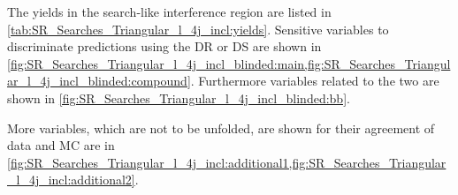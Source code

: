 The yields in the search-like interference region are listed in
\cref{tab:SR_Searches_Triangular_l_4j_incl:yields}.
Sensitive variables to discriminate predictions using the DR or DS are shown in
\cref{fig:SR_Searches_Triangular_l_4j_incl_blinded:main,fig:SR_Searches_Triangular_l_4j_incl_blinded:compound}.
Furthermore variables related to the two \bjets are shown in
\cref{fig:SR_Searches_Triangular_l_4j_incl_blinded:bb}.

More variables, which are not to be unfolded, are shown for their agreement of data and MC are
in \cref{fig:SR_Searches_Triangular_l_4j_incl:additional1,fig:SR_Searches_Triangular_l_4j_incl:additional2}.

\begin{table}[htbp]
  \begin{center}
    
  \end{center}
  \caption{Yields of individual signal and background samples in the
    search-like interference region.
    The total expected yield is using the nominal \tW DR sample.
    Uncertainties are statistical only.}%
  \label{tab:SR_Searches_Triangular_l_4j_incl:yields}
\end{table}

